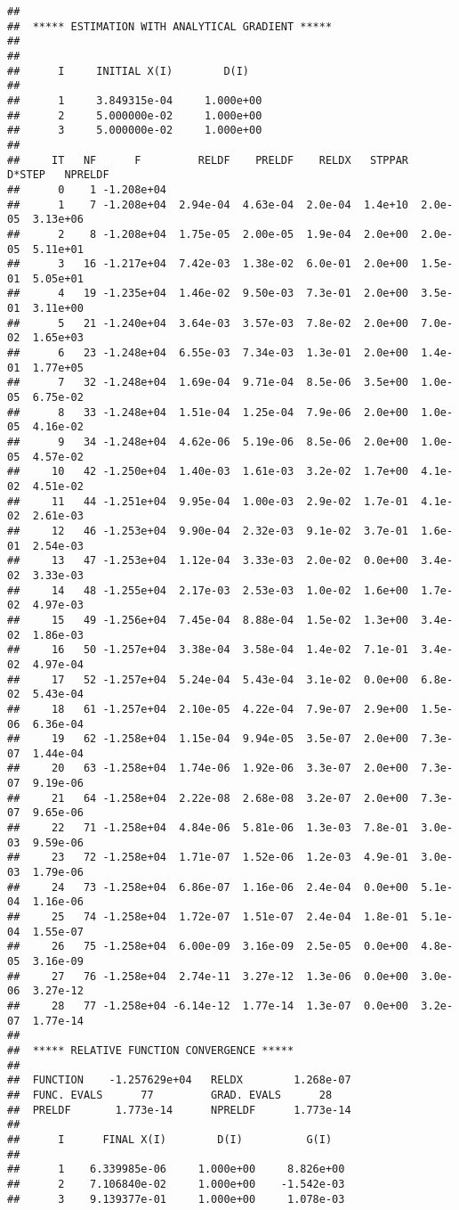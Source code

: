 \documentclass[]{article}
\begin{document}
\begin{verbatim}
## 
##  ***** ESTIMATION WITH ANALYTICAL GRADIENT ***** 
## 
## 
##      I     INITIAL X(I)        D(I)
## 
##      1     3.849315e-04     1.000e+00
##      2     5.000000e-02     1.000e+00
##      3     5.000000e-02     1.000e+00
## 
##     IT   NF      F         RELDF    PRELDF    RELDX   STPPAR   D*STEP   NPRELDF
##      0    1 -1.208e+04
##      1    7 -1.208e+04  2.94e-04  4.63e-04  2.0e-04  1.4e+10  2.0e-05  3.13e+06
##      2    8 -1.208e+04  1.75e-05  2.00e-05  1.9e-04  2.0e+00  2.0e-05  5.11e+01
##      3   16 -1.217e+04  7.42e-03  1.38e-02  6.0e-01  2.0e+00  1.5e-01  5.05e+01
##      4   19 -1.235e+04  1.46e-02  9.50e-03  7.3e-01  2.0e+00  3.5e-01  3.11e+00
##      5   21 -1.240e+04  3.64e-03  3.57e-03  7.8e-02  2.0e+00  7.0e-02  1.65e+03
##      6   23 -1.248e+04  6.55e-03  7.34e-03  1.3e-01  2.0e+00  1.4e-01  1.77e+05
##      7   32 -1.248e+04  1.69e-04  9.71e-04  8.5e-06  3.5e+00  1.0e-05  6.75e-02
##      8   33 -1.248e+04  1.51e-04  1.25e-04  7.9e-06  2.0e+00  1.0e-05  4.16e-02
##      9   34 -1.248e+04  4.62e-06  5.19e-06  8.5e-06  2.0e+00  1.0e-05  4.57e-02
##     10   42 -1.250e+04  1.40e-03  1.61e-03  3.2e-02  1.7e+00  4.1e-02  4.51e-02
##     11   44 -1.251e+04  9.95e-04  1.00e-03  2.9e-02  1.7e-01  4.1e-02  2.61e-03
##     12   46 -1.253e+04  9.90e-04  2.32e-03  9.1e-02  3.7e-01  1.6e-01  2.54e-03
##     13   47 -1.253e+04  1.12e-04  3.33e-03  2.0e-02  0.0e+00  3.4e-02  3.33e-03
##     14   48 -1.255e+04  2.17e-03  2.53e-03  1.0e-02  1.6e+00  1.7e-02  4.97e-03
##     15   49 -1.256e+04  7.45e-04  8.88e-04  1.5e-02  1.3e+00  3.4e-02  1.86e-03
##     16   50 -1.257e+04  3.38e-04  3.58e-04  1.4e-02  7.1e-01  3.4e-02  4.97e-04
##     17   52 -1.257e+04  5.24e-04  5.43e-04  3.1e-02  0.0e+00  6.8e-02  5.43e-04
##     18   61 -1.257e+04  2.10e-05  4.22e-04  7.9e-07  2.9e+00  1.5e-06  6.36e-04
##     19   62 -1.258e+04  1.15e-04  9.94e-05  3.5e-07  2.0e+00  7.3e-07  1.44e-04
##     20   63 -1.258e+04  1.74e-06  1.92e-06  3.3e-07  2.0e+00  7.3e-07  9.19e-06
##     21   64 -1.258e+04  2.22e-08  2.68e-08  3.2e-07  2.0e+00  7.3e-07  9.65e-06
##     22   71 -1.258e+04  4.84e-06  5.81e-06  1.3e-03  7.8e-01  3.0e-03  9.59e-06
##     23   72 -1.258e+04  1.71e-07  1.52e-06  1.2e-03  4.9e-01  3.0e-03  1.79e-06
##     24   73 -1.258e+04  6.86e-07  1.16e-06  2.4e-04  0.0e+00  5.1e-04  1.16e-06
##     25   74 -1.258e+04  1.72e-07  1.51e-07  2.4e-04  1.8e-01  5.1e-04  1.55e-07
##     26   75 -1.258e+04  6.00e-09  3.16e-09  2.5e-05  0.0e+00  4.8e-05  3.16e-09
##     27   76 -1.258e+04  2.74e-11  3.27e-12  1.3e-06  0.0e+00  3.0e-06  3.27e-12
##     28   77 -1.258e+04 -6.14e-12  1.77e-14  1.3e-07  0.0e+00  3.2e-07  1.77e-14
## 
##  ***** RELATIVE FUNCTION CONVERGENCE *****
## 
##  FUNCTION    -1.257629e+04   RELDX        1.268e-07
##  FUNC. EVALS      77         GRAD. EVALS      28
##  PRELDF       1.773e-14      NPRELDF      1.773e-14
## 
##      I      FINAL X(I)        D(I)          G(I)
## 
##      1    6.339985e-06     1.000e+00     8.826e+00
##      2    7.106840e-02     1.000e+00    -1.542e-03
##      3    9.139377e-01     1.000e+00     1.078e-03
\end{verbatim}
\end{document}
